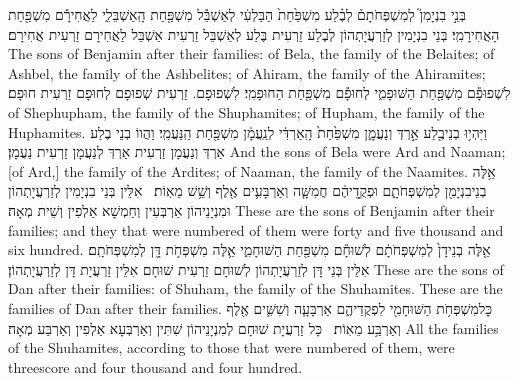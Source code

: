 {בְּנֵ֣י בִנְיָמִן֮ לְמִשְׁפְּחֹתָם֒ לְבֶ֗לַע מִשְׁפַּ֙חַת֙ הַבַּלְעִ֔י לְאַשְׁבֵּ֕ל מִשְׁפַּ֖חַת הָֽאַשְׁבֵּלִ֑י לַאֲחִירָ֕ם מִשְׁפַּ֖חַת הָאֲחִירָמִֽי׃}
{בְּנֵי בִנְיָמִין לְזַרְעֲיָתְהוֹן לְבֶלַע זַרְעִית בֶּלַע לְאַשְׁבֵּל זַרְעִית אַשְׁבֵּל לַאֲחִירָם זַרְעִית אֲחִירָם׃}
{The sons of Benjamin after their families: of Bela, the family of the Belaites; of Ashbel, the family of the Ashbelites; of Ahiram, the family of the Ahiramites;}{}
{לִשְׁפוּפָ֕ם מִשְׁפַּ֖חַת הַשּׁוּפָמִ֑י לְחוּפָ֕ם מִשְׁפַּ֖חַת הַחוּפָמִֽי׃}
{לִשְׁפוּפָם. זַרְעִית שְׁפוּפָם לְחוּפָם זַרְעִית חוּפָם׃}
{of Shephupham, the family of the Shuphamites; of Hupham, the family of the Huphamites.}{}
{וַיִּהְי֥וּ בְנֵי\maqqaf בֶ֖לַע אַ֣רְדְּ וְנַעֲמָ֑ן מִשְׁפַּ֙חַת֙ הָֽאַרְדִּ֔י לְנַֽעֲמָ֔ן מִשְׁפַּ֖חַת הַֽנַּעֲמִֽי׃}
{וַהֲווֹ בְנֵי בֶלַע אַרְדְּ וְנַעֲמָן זַרְעִית אַרְדְּ לְנַעֲמָן זַרְעִית נַעֲמָן׃}
{And the sons of Bela were Ard and Naaman; [of Ard,] the family of the Ardites; of Naaman, the family of the Naamites.}{}
{אֵ֥לֶּה בְנֵי\maqqaf בִנְיָמִ֖ן לְמִשְׁפְּחֹתָ֑ם וּפְקֻ֣דֵיהֶ֔ם חֲמִשָּׁ֧ה וְאַרְבָּעִ֛ים אֶ֖לֶף וְשֵׁ֥שׁ מֵאֽוֹת׃ \setuma }
{אִלֵּין בְּנֵי בִנְיָמִין לְזַרְעֲיָתְהוֹן וּמִנְיָנֵיהוֹן אַרְבְּעִין וְחַמְשָׁא אַלְפִין וְשֵׁית מְאָה׃}
{These are the sons of Benjamin after their families; and they that were numbered of them were forty and five thousand and six hundred.}{}
{אֵ֤לֶּה בְנֵי\maqqaf דָן֙ לְמִשְׁפְּחֹתָ֔ם לְשׁוּחָ֕ם מִשְׁפַּ֖חַת הַשּׁוּחָמִ֑י אֵ֛לֶּה מִשְׁפְּחֹ֥ת דָּ֖ן לְמִשְׁפְּחֹתָֽם׃}
{אִלֵּין בְּנֵי דָּן לְזַרְעֲיָתְהוֹן לְשׁוּחָם זַרְעִית שׁוּחָם אִלֵּין זַרְעֲיָת דָּן לְזַרְעֲיָתְהוֹן׃}
{These are the sons of Dan after their families: of Shuham, the family of the Shuhamites. These are the families of Dan after their families.}{}
{כׇּל\maqqaf מִשְׁפְּחֹ֥ת הַשּׁוּחָמִ֖י לִפְקֻדֵיהֶ֑ם אַרְבָּעָ֧ה וְשִׁשִּׁ֛ים אֶ֖לֶף וְאַרְבַּ֥ע מֵאֽוֹת׃ \setuma }
{כָּל זַרְעֲיָת שׁוּחָם לְמִנְיָנֵיהוֹן שִׁתִּין וְאַרְבְּעָא אַלְפִין וְאַרְבַּע מְאָה׃}
{All the families of the Shuhamites, according to those that were numbered of them, were threescore and four thousand and four hundred.}{}
